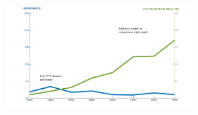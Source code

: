 \documentclass[11pt]{amsart}
\begin{document}
\noindent

\smallskip


\smallskip

\begin{figure}[h]
    \centering 
    \includegraphics[width=0.64\textwidth]{factorCR.png}  
    \label{fig:histogram} 
\end{figure}
\end{document}
